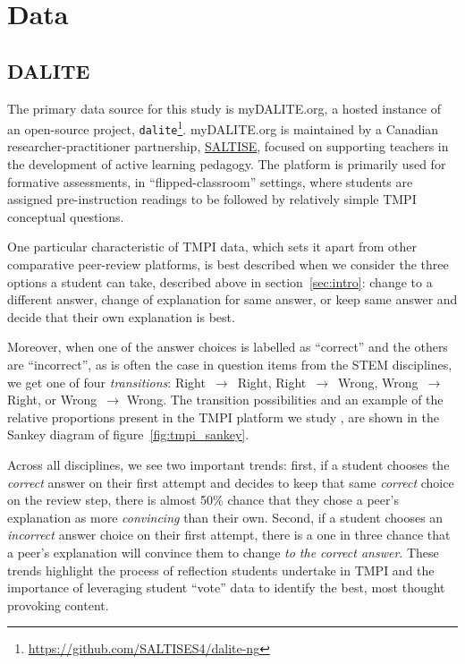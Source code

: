 \documentclass[notitlepage,12pt]{jedm}
\begin{document}
\section{Data}\label{sec:datasets}


\subsection{DALITE}\label{sec:dataset_dalite}
The primary data source for this study is myDALITE.org, a hosted 
instance of an open-source project, 
\verb|dalite|\footnote{\url{https://github.com/SALTISES4/dalite-ng}}. 
myDALITE.org is maintained by a Canadian researcher-practitioner partnership, 
\href{saltise.ca}{SALTISE}, focused on supporting teachers in the development 
of active learning pedagogy.
The platform is primarily used for formative assessments, in 
``flipped-classroom'' settings, where students are assigned pre-instruction 
readings to be followed by relatively simple TMPI conceptual questions.

One particular characteristic of TMPI data, which sets it apart from other 
comparative peer-review platforms, is best described when we consider the three 
options a student can take, described above in section~\ref{sec:intro}: change 
to a different answer, change of explanation for same answer, or keep same answer 
and decide that their own explanation is best.

Moreover, when one of the answer choices is labelled as ``correct'' and the 
others are ``incorrect'', as is often the case in question items from the STEM 
disciplines, we get one of four \textit{transitions}: Right~$\rightarrow$~Right, Right~$\rightarrow$~Wrong, Wrong~$\rightarrow$ Right, or Wrong~$\rightarrow$ Wrong.
The transition possibilities and an example of the relative proportions 
present in the TMPI platform we study \cite{bhatnagar_dataset_2020}, are 
shown in the Sankey diagram of figure~\ref{fig:tmpi_sankey}.

Across all disciplines, we see two important trends: first, if a student 
chooses the \textit{correct} answer on their first attempt and decides to keep 
that same \textit{correct} choice on the review step, there is almost 50\% 
chance that they chose a peer's explanation as more \textit{convincing}  than 
their own. 
Second, if a student chooses an \textit{incorrect} answer choice on their first 
attempt, there is a one in three chance that a peer's explanation will convince 
them to change \textit{to the correct answer}.
These trends highlight the process of reflection students undertake in TMPI 
and the importance of leveraging student ``vote'' data to identify the best, 
most thought provoking content.
\end{document}
